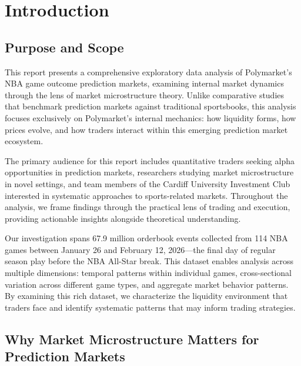 
\chapter{Introduction}
\label{sec:introduction}

\section{Purpose and Scope}

This report presents a comprehensive exploratory data analysis of Polymarket's NBA game outcome prediction markets, examining internal market dynamics through the lens of market microstructure theory. Unlike comparative studies that benchmark prediction markets against traditional sportsbooks, this analysis focuses exclusively on Polymarket's internal mechanics: how liquidity forms, how prices evolve, and how traders interact within this emerging prediction market ecosystem.

The primary audience for this report includes quantitative traders seeking alpha opportunities in prediction markets, researchers studying market microstructure in novel settings, and team members of the Cardiff University Investment Club interested in systematic approaches to sports-related markets. Throughout the analysis, we frame findings through the practical lens of trading and execution, providing actionable insights alongside theoretical understanding.

Our investigation spans 67.9 million orderbook events collected from 114 NBA games between January 26 and February 12, 2026---the final day of regular season play before the NBA All-Star break. This dataset enables analysis across multiple dimensions: temporal patterns within individual games, cross-sectional variation across different game types, and aggregate market behavior patterns. By examining this rich dataset, we characterize the liquidity environment that traders face and identify systematic patterns that may inform trading strategies.

\section{Why Market Microstructure Matters for Prediction Markets}

